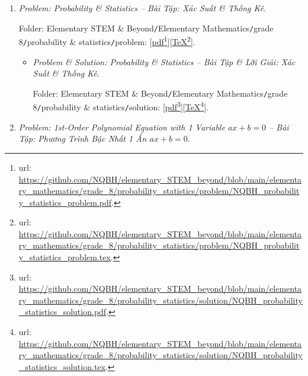 \documentclass[12pt]{article}
\begin{document}
\begin{enumerate}
\begin{itemize}
		Folder: {\sf Elementary STEM \& Beyond{\tt/}Elementary Mathematics{\tt/}grade 8{\tt/}triangle quadrilateral{\tt/}solution}: [\href{https://github.com/NQBH/elementary_STEM_beyond/blob/main/elementary_mathematics/grade_8/triangle_quadrilateral/solution/NQBH_triangle_quadrilateral_solution.pdf}{pdf}\footnote{{\sc url}: \url{https://github.com/NQBH/elementary_STEM_beyond/blob/main/elementary_mathematics/grade_8/triangle_quadrilateral/solution/NQBH_triangle_quadrilateral_solution.pdf}.}][\href{https://github.com/NQBH/elementary_STEM_beyond/blob/main/elementary_mathematics/grade_8/triangle_quadrilateral/solution/NQBH_triangle_quadrilateral_solution.tex}{\TeX}\footnote{{\sc url}: \url{https://github.com/NQBH/elementary_STEM_beyond/blob/main/elementary_mathematics/grade_8/triangle_quadrilateral/solution/NQBH_triangle_quadrilateral_solution.tex}.}].
	\end{itemize}
	\item {\it Problem: Probability \& Statistics -- Bài Tập: Xác Suất \& Thống Kê}.
	
	Folder: {\sf Elementary STEM \& Beyond{\tt/}Elementary Mathematics{\tt/}grade 8{\tt/}probability \& statistics{\tt/}problem}: [\href{https://github.com/NQBH/elementary_STEM_beyond/blob/main/elementary_mathematics/grade_8/probability_statistics/problem/NQBH_probability_statistics_problem.pdf}{pdf}\footnote{{\sc url}: \url{https://github.com/NQBH/elementary_STEM_beyond/blob/main/elementary_mathematics/grade_8/probability_statistics/problem/NQBH_probability_statistics_problem.pdf}.}][\href{https://github.com/NQBH/elementary_STEM_beyond/blob/main/elementary_mathematics/grade_8/probability_statistics/problem/NQBH_probability_statistics_problem.tex}{\TeX}\footnote{{\sc url}: \url{https://github.com/NQBH/elementary_STEM_beyond/blob/main/elementary_mathematics/grade_8/probability_statistics/problem/NQBH_probability_statistics_problem.tex}.}].
	\begin{itemize}
		\item {\it Problem \& Solution: Probability \& Statistics -- Bài Tập \& Lời Giải: Xác Suất \& Thống Kê}.
		
		Folder: {\sf Elementary STEM \& Beyond{\tt/}Elementary Mathematics{\tt/}grade 8{\tt/}probability \& statistics{\tt/}solution}: [\href{https://github.com/NQBH/elementary_STEM_beyond/blob/main/elementary_mathematics/grade_8/probability_statistics/solution/NQBH_probability_statistics_solution.pdf}{pdf}\footnote{{\sc url}: \url{https://github.com/NQBH/elementary_STEM_beyond/blob/main/elementary_mathematics/grade_8/probability_statistics/solution/NQBH_probability_statistics_solution.pdf}.}][\href{https://github.com/NQBH/elementary_STEM_beyond/blob/main/elementary_mathematics/grade_8/probability_statistics/solution/NQBH_probability_statistics_solution.tex}{\TeX}\footnote{{\sc url}: \url{https://github.com/NQBH/elementary_STEM_beyond/blob/main/elementary_mathematics/grade_8/probability_statistics/solution/NQBH_probability_statistics_solution.tex}.}].
	\end{itemize}
	\item {\it Problem: 1st-Order Polynomial Equation with 1 Variable $ax + b = 0$ -- Bài Tập: Phương Trình Bậc Nhất 1 Ẩn $ax + b = 0$}.
	

\end{enumerate}
\end{document}
